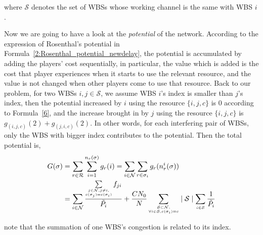 \documentclass[times]{ettauth}
\theoremstyle{mytheoremstyle}
\theoremstyle{mytheoremstyle}
\theoremstyle{mytheoremstyle}
\begin{document}
where $\mathcal{S}$ denotes the set of WBSs whose working channel is the same with WBS $i$.

Now we are going to have a look at the \textit{potential} of the network.
According to the expression of Rosenthal's potential in Formula~\ref{2:Rosenthal_potential_newdelay}, the potential is accumulated by adding the players' cost sequentially, in particular, the value which is added is the cost that player experiences when it starts to use the relevant resource, and the value is not changed when other players come to use that resource.
Back to our problem, for two WBSs $i,j\in \mathcal{S}$, we assume WBS $i$'s index is smaller than $j$'s index, then the potential increased by $i$ using the resource $\{i,j,c\}$ is 0 according to Formula~\ref{6}, and the increase brought in by $j$ using the resource $\{i,j,c\}$ is $g_{(i,j,c)}(2)+g_{(j,i,c)}(2)$. 
In other words, for each interfering pair of WBSs, only the WBS with bigger index contributes to the potential. 
Then the total potential is, 
\begin{equation}
\label{allPotential}
\begin{split}	
G(\sigma) 
& =\sum\limits^{}_{r\in \mathcal{R}} \sum\limits^{n_r(\sigma)}_{i=1} g_r(i)  =\sum\limits_{i\in \mathcal{N}} \sum\limits^{}_{r\in \sigma_i} g_r(n_r^i(\sigma))\\
& = \sum\limits_{i\in \mathcal{N}}\dfrac{\sum\limits_{\tiny\substack{j\in \mathcal{N}, j\ne i,\\ c(\sigma_j)=c(\sigma_i)}}f_{ji}}{\tilde{P_i}} + \dfrac{CN_0}{N}\sum\limits_{\tiny\substack{\mathcal{S}\subset \mathcal{N},\\ \forall i\in \mathcal{S}, c(\sigma_i)=c}} \mid \mathcal{S}\mid   \sum\limits_{\tiny\substack{i\in \mathcal{S}}}\frac{1}{\tilde{P_i}}
\end{split}
\end{equation}

 note that the summation of one WBS's congestion is related to its index. 

%
\end{document}
